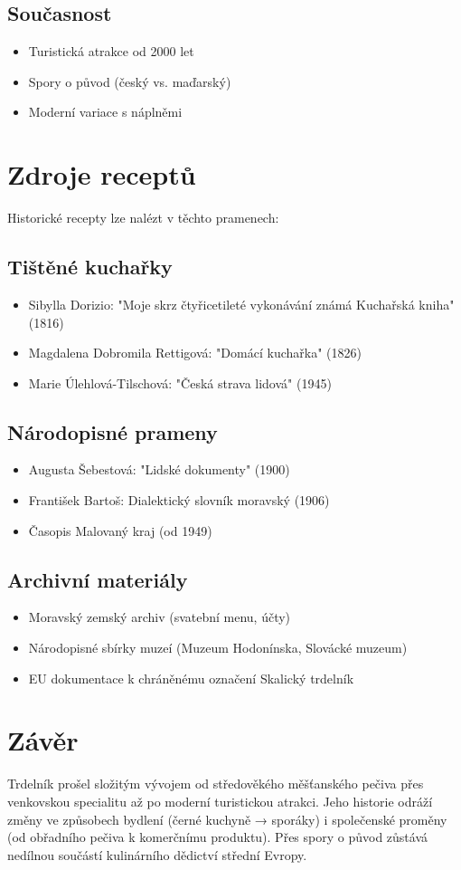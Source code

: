 \documentclass[a5paper,10pt]{book}
\begin{document}
\section{Současnost}
\begin{itemize}
\item Turistická atrakce od 2000 let
\item Spory o původ (český vs. maďarský)
\item Moderní variace s náplněmi
\end{itemize}

\chapter{Zdroje receptů}
Historické recepty lze nalézt v těchto pramenech:

\section{Tištěné kuchařky}
\begin{itemize}
\item Sibylla Dorizio: "Moje skrz čtyřicetileté vykonávání známá Kuchařská kniha" (1816)
\item Magdalena Dobromila Rettigová: "Domácí kuchařka" (1826)
\item Marie Úlehlová-Tilschová: "Česká strava lidová" (1945)
\end{itemize}

\section{Národopisné prameny}
\begin{itemize}
\item Augusta Šebestová: "Lidské dokumenty" (1900)
\item František Bartoš: Dialektický slovník moravský (1906)
\item Časopis Malovaný kraj (od 1949)
\end{itemize}

\section{Archivní materiály}
\begin{itemize}
\item Moravský zemský archiv (svatební menu, účty)
\item Národopisné sbírky muzeí (Muzeum Hodonínska, Slovácké muzeum)
\item EU dokumentace k chráněnému označení Skalický trdelník
\end{itemize}

\chapter{Závěr}

Trdelník prošel složitým vývojem od středověkého měšťanského pečiva přes venkovskou specialitu až po moderní turistickou atrakci. Jeho historie odráží změny ve způsobech bydlení (černé kuchyně → sporáky) i společenské proměny (od obřadního pečiva k komerčnímu produktu). Přes spory o původ zůstává nedílnou součástí kulinárního dědictví střední Evropy.

  
\end{document}
